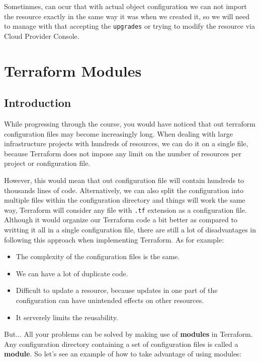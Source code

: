 \documentclass{article}
\newenvironment{blocktemplateIII}[1]{%
    \tcolorbox[beamer,%
    noparskip,breakable,
    ,colframe=Red,%
    colbacklower=LimeGreen!75!LightGreen,%
    title=#1]}%
    {\endtcolorbox}
\begin{document}
\begin{blocktemplateIII}{WARNING}
Sometinmes, can ocur that with actual object configuration we can not import the resource exactly in the same way it was when we created it, so we will need to manage with that accepting the \verb|upgrades| or trying to modify the resource via Cloud Provider Console.
\end{blocktemplateIII}

\section{Terraform Modules}

\subsection{Introduction}
While progressing through the course, you would have noticed that out terraform configuration files may become increasingly long. When dealing with large infrastructure projects with hundreds of resources, we can do it on a single file, because Terraform does not impose any limit on the number of resources per project or configuration file.

However, this would mean that out configuration file will contain hundreds to thousands lines of code. Alternatively, we can also split the configuration into multiple files within the configuration directory and things will work the same way, Terraform will consider any file with \verb|.tf| extension as a configuration file. Although it would organize our Terraform code a bit better as compared to writting it all in a single configuration file, there are still a lot of disadvantages in following this approach when implementing Terraform. As for example: 

\begin{itemize}
    \item The complexity of the configuration files is the same.
    \item We can have a lot of duplicate code.
    \item Difficult to update a resource, because updates in one part of the configuration can have unintended effects on other resources.
    \item It serverely limits the reusability.
\end{itemize}

But... All your problems can be solved by making use of \textbf{modules} in Terraform. Any configuration directory containing a set of configuration files is called a \textbf{module}. So let's see an example of how to take advantage of using modules:
\end{document}
